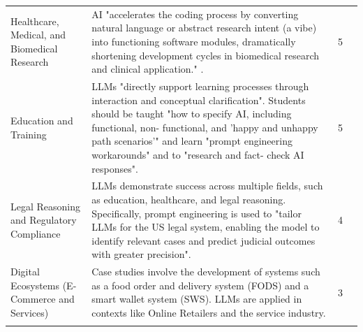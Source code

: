 {\begin{longtable}{>{\raggedright\arraybackslash} p{3cm} p{9.5cm} p{0.2cm} p{1.5cm}}
Healthcare, Medical, and Biomedical Research & AI "accelerates the coding process by converting natural language or abstract research intent (a vibe) into functioning software modules, dramatically shortening development cycles in biomedical research and clinical application." \cite{Moore:2025vc}. & 5 & \cite{Moore:2025vc, Basha:2025tt, Hou:2025cl, Zhang:2025ea, Bai:2025ci} \\ \addlinespace

Education and Training & LLMs "directly support learning processes through interaction and conceptual clarification". Students should be taught "how to specify AI, including functional, non- functional, and 'happy and unhappy path scenarios'" and learn "prompt engineering workarounds" and to "research and fact- check AI responses". \cite{Ramos:2025aa} & 5 & \cite{Ramos:2025aa, Hemmat:2025rd, Zamfiroiu:2025ec, Zhang:2025ea, Hou:2025cl} \\ \addlinespace

Legal Reasoning and Regulatory Compliance & LLMs demonstrate success across multiple fields, such as education, healthcare, and legal reasoning. Specifically, prompt engineering is used to "tailor LLMs for the US legal system, enabling the model to identify relevant cases and predict judicial outcomes with greater precision". \cite{Jabrw:2025ss} & 4 &  \cite{Jabrw:2025ss, Bai:2025ci, Ramos:2025aa, AlHashimi:2025er} \\ \addlinespace

Digital Ecosystems (E-Commerce and Services) & Case studies involve the development of systems such as a food order and delivery system (FODS) and a smart wallet system (SWS). LLMs are applied in contexts like Online Retailers and the service industry. \cite{Kim:2025ao, Zhang:2025ea} & 3 & \cite{AlHashimi:2025er, Kim:2025ao, Zhang:2025ea} \\ \addlinespace

\end{longtable}
}

